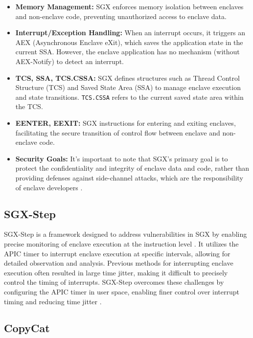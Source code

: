 \documentclass{llncs}
\begin{document}
\begin{itemize}
  \item \textbf{Memory Management:}
    SGX enforces memory isolation between enclaves and non-enclave code,
    preventing unauthorized access to enclave data.
  \item \textbf{Interrupt/Exception Handling:}
    When an interrupt occurs, it triggers an AEX (Asynchronous Enclave eXit),
    which saves the application state in the current SSA.
    However, the enclave application has no mechanism (without AEX-Notify) to detect an interrupt.
  \item \textbf{TCS, SSA, TCS.CSSA:}
    SGX defines structures such as Thread Control Structure (TCS) and Saved State Area (SSA)
    to manage enclave execution and state transitions.
    \texttt{TCS.CSSA} refers to the current saved state area within the TCS.
  \item \textbf{EENTER, EEXIT:}
    SGX instructions for entering and exiting enclaves,
    facilitating the secure transition of control flow between enclave and non-enclave code.
  \item \textbf{Security Goals:}
    It's important to note that SGX's primary goal is to protect
    the confidentiality and integrity of enclave data and code,
    rather than providing defenses against side-channel attacks,
    which are the responsibility of enclave developers \cite{CostanD16}.
\end{itemize}

\subsection{SGX-Step}

SGX-Step is a framework designed to address vulnerabilities in SGX
by enabling precise monitoring of enclave execution at the instruction level \cite{ArnautovTGKMPLM16}.
It utilizes the APIC timer to interrupt enclave execution at specific intervals,
allowing for detailed observation and analysis.
Previous methods for interrupting enclave execution often resulted in large time jitter,
making it difficult to precisely control the timing of interrupts.
SGX-Step overcomes these challenges by configuring the APIC timer in user space,
enabling finer control over interrupt timing and reducing time jitter \cite{ArnautovTGKMPLM16}.


\subsection{CopyCat}
\end{document}
